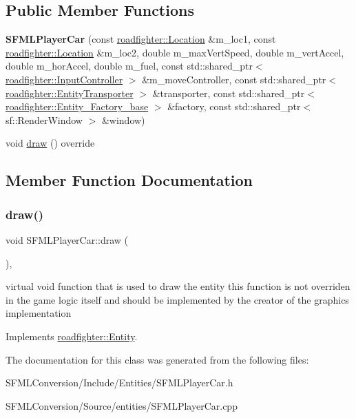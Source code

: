 \subsection*{Public Member Functions}
\begin{DoxyCompactItemize}
\item 
\mbox{\label{classSFMLPlayerCar_a9abc7243272952e87a6fe14973184e37}} 
{\bfseries S\+F\+M\+L\+Player\+Car} (const \hyperlink{classroadfighter_1_1Location}{roadfighter\+::\+Location} \&m\+\_\+loc1, const \hyperlink{classroadfighter_1_1Location}{roadfighter\+::\+Location} \&m\+\_\+loc2, double m\+\_\+max\+Vert\+Speed, double m\+\_\+vert\+Accel, double m\+\_\+hor\+Accel, double m\+\_\+fuel, const std\+::shared\+\_\+ptr$<$ \hyperlink{classroadfighter_1_1InputController}{roadfighter\+::\+Input\+Controller} $>$ \&m\+\_\+move\+Controller, const std\+::shared\+\_\+ptr$<$ \hyperlink{classroadfighter_1_1EntityTransporter}{roadfighter\+::\+Entity\+Transporter} $>$ \&transporter, const std\+::shared\+\_\+ptr$<$ \hyperlink{classroadfighter_1_1Entity__Factory__base}{roadfighter\+::\+Entity\+\_\+\+Factory\+\_\+base} $>$ \&factory, const std\+::shared\+\_\+ptr$<$ sf\+::\+Render\+Window $>$ \&window)
\item 
void \hyperlink{classSFMLPlayerCar_ab4adedb2554e5f5eb59b7565a592c2b2}{draw} () override
\end{DoxyCompactItemize}


\subsection{Member Function Documentation}
\mbox{\label{classSFMLPlayerCar_ab4adedb2554e5f5eb59b7565a592c2b2}} 
\subsubsection{\texorpdfstring{draw()}{draw()}}
{\footnotesize\ttfamily void S\+F\+M\+L\+Player\+Car\+::draw (\begin{DoxyParamCaption}{ }\end{DoxyParamCaption})\hspace{0.3cm}{\ttfamily [override]}, {\ttfamily [virtual]}}

virtual void function that is used to draw the entity this function is not overriden in the game logic itself and should be implemented by the creator of the graphics implementation 

Implements \hyperlink{classroadfighter_1_1Entity_ac516f8005f969ad5a86c252e5a3640ee}{roadfighter\+::\+Entity}.



The documentation for this class was generated from the following files\+:\begin{DoxyCompactItemize}
\item 
S\+F\+M\+L\+Conversion/\+Include/\+Entities/S\+F\+M\+L\+Player\+Car.\+h\item 
S\+F\+M\+L\+Conversion/\+Source/entities/S\+F\+M\+L\+Player\+Car.\+cpp\end{DoxyCompactItemize}
